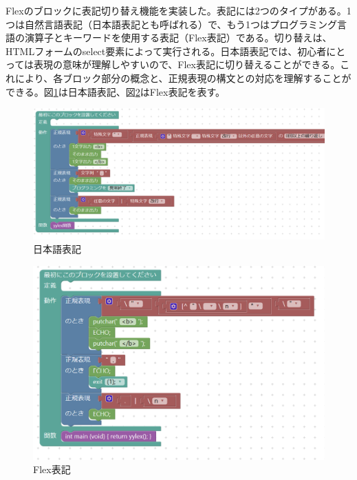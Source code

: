 \documentclass{risepaper}
\begin{document}
Flexのブロックに表記切り替え機能を実装した。表記には2つのタイプがある。1つは自然言語表記（日本語表記とも呼ばれる）で、もう1つはプログラミング言語の演算子とキーワードを使用する表記（Flex表記）である。切り替えは、HTMLフォームのselect要素によって実行される。日本語表記では、初心者にとっては表現の意味が理解しやすいので、Flex表記に切り替えることができる。これにより、各ブロック部分の概念と、正規表現の構文との対応を理解することができる。図\ref{fig:switching_ja}は日本語表記、図\ref{fig:switching_flex}はFlex表記を表す。

\begin{figure}[h]
\begin{center}
\includegraphics[scale=0.5]{img/switching_ja.PNG}
\caption{日本語表記}%
\label{fig:switching_ja}
\end{center}%
\end{figure}%

\begin{figure}[h]
\begin{center}
\includegraphics[scale=0.5]{img/switching_flex.PNG}
\caption{Flex表記}%
\label{fig:switching_flex}
\end{center}%
\end{figure}%
\end{document}

